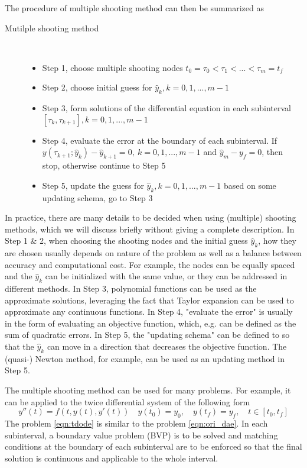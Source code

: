 	The procedure of multiple shooting method can then be summarized as
	\begin{description}
		\item[Mutilple shooting method] \
		\begin{itemize}
			\item Step 1, choose multiple shooting nodes $t_0 = \tau_0 < \tau_1 < ... < \tau_m = t_f$ 
			\item Step 2, choose initial guess for $\hat{y}_k, k = 0, 1, ..., m-1$ 
			\item Step 3, form solutions of the differential equation in each subinterval $[\tau_k, \tau_{k+1}], k = 0, 1, ..., m-1$
			\item Step 4, evaluate the error at the boundary of each subinterval. If $y(\tau_{k+1}; \hat{y}_k) - \hat{y}_{k+1} = 0, \  k = 0, 1, ..., m-1$ and $\hat{y}_{m} - y_f =0$, then stop, otherwise continue to Step 5
			\item Step 5, update the guess for $\hat{y}_k, k = 0, 1, ..., m-1$ based on some updating schema, go to Step 3
		\end{itemize}
	\end{description}
	
	In practice, there are many details to be decided when using (multiple) shooting methods, which we will discuss briefly without giving a complete description. In Step 1 \& 2, when choosing the shooting nodes and the initial guess $\hat{y}_k$, how they are chosen usually depends on nature of the problem as well as a balance between accuracy and computational cost. For example, the nodes can be equally spaced and the $\hat{y}_k$ can be initialized with the same value, or they can be addressed in different methods. In Step 3, polynomial functions can be used as the approximate solutions, leveraging the fact that Taylor expansion can be used to approximate any continuous functions. In Step 4, "evaluate the error" is usually in the form of evaluating an objective function, which, e.g. can be defined as the sum of quadratic errors. In Step 5, the "updating schema" can be defined to so that the $\hat{y}_k$ can move in a direction that decreases the objective function. The (quasi-) Newton method, for example, can be used as an updating method in Step 5. 
	
	
	The multiple shooting method can be used for many problems. For example, it can be applied to the twice differential system of the following form 
	\begin{equation}
		y''(t) = f(t, y(t), y'(t))  \quad y(t_0) = y_0, \quad y(t_f) = y_f,  \quad t \in [t_0, t_f]
		\label{eqn:tdode}
	\end{equation}
	The problem \ref{eqn:tdode} is similar to the problem \ref{eqn:ori_dae}. In each subinterval, a boundary value problem (BVP) is to be solved and matching conditions at the boundary of each subinterval are to be enforced so that the final solution is continuous and applicable to the whole interval. 
	
